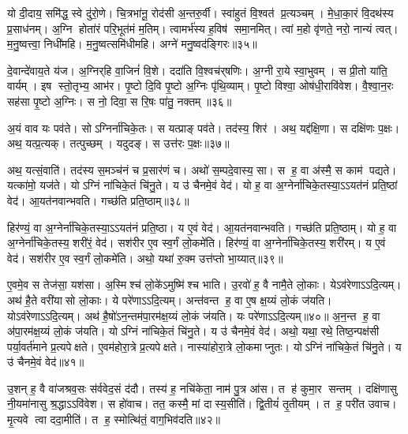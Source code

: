    यो दी॒दाय॒ समि॑द्ध॒ स्वे दु॑रो॒णे।
   चि॒त्रभा॑नू॒ रोद॑सी अ॒न्तरु॒र्वी।
   स्वा॑हुतं वि॒श्वत॑ प्र॒त्यञ्चम्।
   मे॒धा॒का॒रं वि॒दथ॑स्य प्र॒साध॑नम्।
   अ॒ग्नि होता॑रं परि॒भूत॑मं म॒तिम्।
   त्वामर्भ॑स्य ह॒विष॑ समा॒नमित्।
   त्वां म॒हो वृ॑णते॒ नरो॒ नान्यं त्वत्।
   म॒नु॒ष्वत्त्वा॒ निधी॑महि।
   म॒नु॒ष्वत्समि॑धीमहि।
   अग्ने॑ मनु॒ष्वद॑ङ्गिरः॥३५॥

   दे॒वान्दे॑वाय॒ते य॑ज।
   अ॒ग्निर्{‌}हि वा॒जिनं॑ वि॒शे।
   ददा॑ति वि॒श्वच॑र्{‌}षणिः।
   अ॒ग्नी रा॒ये स्वा॒भुवम्।
   स प्री॒तो या॑ति॒ वार्यम्।
   इष स्तो॒तृभ्य॒ आभ॑र।
   पृ॒ष्टो दि॒वि पृ॒ष्टो अ॒ग्निः पृ॑थि॒व्याम्।
   पृ॒ष्टो विश्वा॒ ओष॑धी॒रावि॑वेश।
   वै॒श्वा॒न॒रः सह॑सा पृ॒ष्टो अ॒ग्निः।
   स नो॒ दिवा॒ स रि॒षः पा॑तु॒ नक्तम्॥३६॥
\anuvakamend
  
   अ॒यं वाव यः पव॑ते।
   सोऽग्निर्ना॑चिके॒तः।
   स यत्प्राङ् पव॑ते।
   तद॑स्य॒ शिर॑।
   अथ॒ यद्द॑क्षि॒णा।
   स दक्षि॑णः प॒क्षः।
   अथ॒ यत्प्र॒त्यक्।
   तत्पुच्छम्।
   यदुदङ्{‌}\sG{}।
   स उत्त॑रः प॒क्षः॥३७॥

   अथ॒ यत्सं॒वाति॑।
   तद॑स्य स॒मञ्च॑नं च प्र॒सार॑णं च।
   अथो॑ स॒म्पदे॒वास्य॒ सा।
   स ह॒ वा अ॑स्मै॒ स काम॑ पद्यते।
   यत्का॑मो॒ यज॑ते।
   योऽग्निं ना॑चिके॒तं चि॑नु॒ते।
   य उ॑ चैनमे॒वं वेद॑।
   यो ह॒ वा अ॒ग्नेर्ना॑चिके॒तस्या॒ऽऽयत॑नं प्रति॒ष्ठां वेद॑।
   आ॒यत॑नवान्भवति।
   गच्छ॑ति प्रति॒ष्ठाम्॥३८॥

   हिर॑ण्यं॒ वा अ॒ग्नेर्ना॑चिके॒तस्या॒ऽऽयत॑नं प्रति॒ष्ठा।
   य ए॒वं वेद॑।
   आ॒यत॑नवान्भवति।
   गच्छ॑ति प्रति॒ष्ठाम्।
   यो ह॒ वा अ॒ग्नेर्ना॑चिके॒तस्य॒ शरी॑रं॒ वेद॑।
   सश॑रीर ए॒व स्व॒र्गं लो॒कमे॑ति।
   हिर॑ण्यं॒ वा अ॒ग्नेर्ना॑चिके॒तस्य॒ शरी॑रम्।
   य ए॒वं वेद॑।
   सश॑रीर ए॒व स्व॒र्गं लो॒कमे॑ति।
   अथो॒ यथा॑ रु॒क्म उत्त॑प्तो भा॒य्यात्॥३९॥

   ए॒वमे॒व स तेज॑सा॒ यश॑सा।
   अ॒स्मिश्च॑ लो॒के॑ऽमुष्मि॑श्च भाति।
   उ॒रवो॑ ह॒ वै नामै॒ते लो॒काः।
   येऽव॑रेणाऽऽदि॒त्यम्।
   अथ॑ है॒ते वरी॑यासो लो॒काः।
   ये परे॑णाऽऽदि॒त्यम्।
   अन्त॑वन्त ह॒ वा ए॒ष क्ष॒य्यं लो॒कं ज॑यति।
   योऽव॑रेणाऽऽदि॒त्यम्।
   अथ॑ है॒षो॑ऽन॒न्तम॑पा॒रम॑क्ष॒य्यं लो॒कं ज॑यति।
   यः परे॑णाऽऽदि॒त्यम्॥४०॥
   अ॒न॒न्त ह॒ वा अ॑पा॒रम॑क्ष॒य्यं लो॒कं ज॑यति।
   योऽग्निं ना॑चिके॒तं चि॑नु॒ते।
   य उ॑ चैनमे॒वं वेद॑।
   अथो॒ यथा॒ रथे॒ तिष्ठ॒न्पक्ष॑सी पर्या॒वर्त॑माने प्र॒त्यपेक्षते।
   ए॒वम॑होरा॒त्रे प्र॒त्यपेक्षते।
   नास्या॑होरा॒त्रे लो॒कमाप्नुतः।
   योऽग्निं ना॑चिके॒तं चि॑नु॒ते।
   य उ॑ चैनमे॒वं वेद॑॥४१॥
\anuvakamend
  
   उ॒शन् ह॒ वै वा॑जश्रव॒सः स॑र्ववेद॒सं द॑दौ।
   तस्य॑ ह॒ नचि॑केता॒ नाम॑ पु॒त्र आ॑स।
   त ह॑ कुमा॒र सन्तम्।
   दक्षि॑णासु नी॒यमा॑नासु श्र॒द्धाऽऽवि॑वेश।
   स हो॑वाच।
   तत॒ कस्मै॒ मां दास्य॒सीति॑।
   द्वि॒तीयं॑ तृ॒तीयम्।
   त ह॒ परी॑त उवाच।
   मृ॒त्यवे त्वा ददा॒मीति॑।
   त ह॒ स्मोत्थि॑तं॒ वाग॒भिव॑दति॥४२॥

